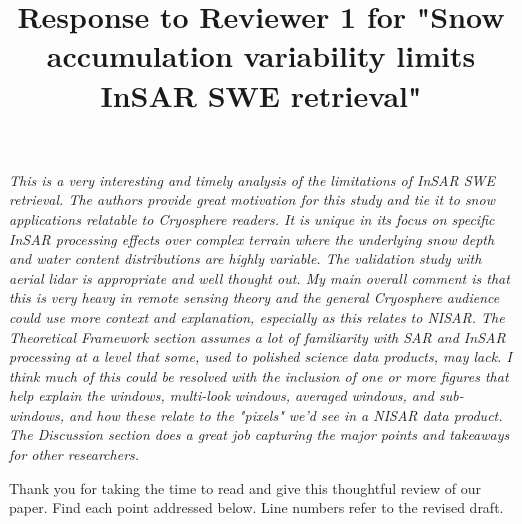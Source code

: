 \documentclass[tc, manuscript]{copernicus}
\begin{document}
\title{Response to Reviewer 1 for "Snow accumulation variability limits InSAR SWE retrieval"}







\maketitle


\textit{
This is a very interesting and timely analysis of the limitations of InSAR SWE retrieval. The authors provide great motivation for this study and tie it to snow applications relatable to Cryosphere readers. It is unique in its focus on specific InSAR processing effects over complex terrain where the underlying snow depth and water content distributions are highly variable. The validation study with aerial lidar is appropriate and well thought out. My main overall comment is that this is very heavy in remote sensing theory and the general Cryosphere audience could use more context and explanation, especially as this relates to NISAR. The Theoretical Framework section assumes a lot of familiarity with SAR and InSAR processing at a level that some, used to polished science data products, may lack. I think much of this could be resolved with the inclusion of one or more figures that help explain the windows, multi-look windows, averaged windows, and sub-windows, and how these relate to the "pixels" we'd see in a NISAR data product. The Discussion section does a great job capturing the major points and takeaways for other researchers.}

Thank you for taking the time to read and give this thoughtful review of our paper. Find each point addressed below. Line numbers refer to the revised draft.
\end{document}
